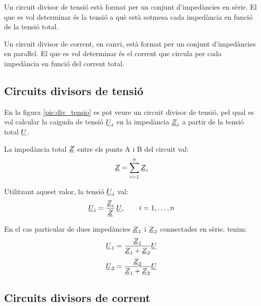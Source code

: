 Un circuit divisor de tensió està format per un conjunt
d'impedàncies en sèrie. El que es vol determinar  és  la
tensió a què està sotmesa cada impedància en funció de la tensió total.

Un circuit divisor de corrent, en canvi, està format per un conjunt
d'impedàncies en paraŀlel. El que es vol determinar és el
corrent que circula per cada impedància en funció del corrent
total.

\subsection{Circuits divisors de tensió}\label{sec:circ-div-tens}

En la figura \vref{pic:div_tensio} es pot veure un circuit divisor
de tensió, pel qual es vol calcular la caiguda de tensió
$\underline{U}_i$ en la impedància $\underline{Z}_i$ a partir de la tensió total $\underline{U}$.

\begin{center}
	\centering
    
    \label{pic:div_tensio}
\end{center}

La impedància total $\underline{Z}$ entre els punts A i B del circuit val:
\begin{equation}\label{eq:z_serie}
    \underline{Z} = \sum_{i=1}^n \underline{Z}_i
\end{equation}

Utilitzant aquest valor, la tensió $\underline{U}_i$ val:
\begin{equation}
    \underline{U}_i = \frac{\underline{Z}_i}{\underline{Z}}\,\underline{U}, \qquad i=1,\dots,n\label{eq:div_tensio}
\end{equation}

En el cas particular de dues impedàncies $\underline{Z}_1$ i $\underline{Z}_2$ connectades en sèrie, tenim:
\begin{subequations}
\begin{align}
    \underline{U}_1 &= \frac{\underline{Z}_1}{\underline{Z}_1+\underline{Z}_2} \underline{U}  \\[0.5ex]
    \underline{U}_2 &= \frac{\underline{Z}_2}{\underline{Z}_1+\underline{Z}_2} \underline{U}
\end{align}
\end{subequations}

\subsection{Circuits divisors de corrent}\label{sec:circ-div-corr}

